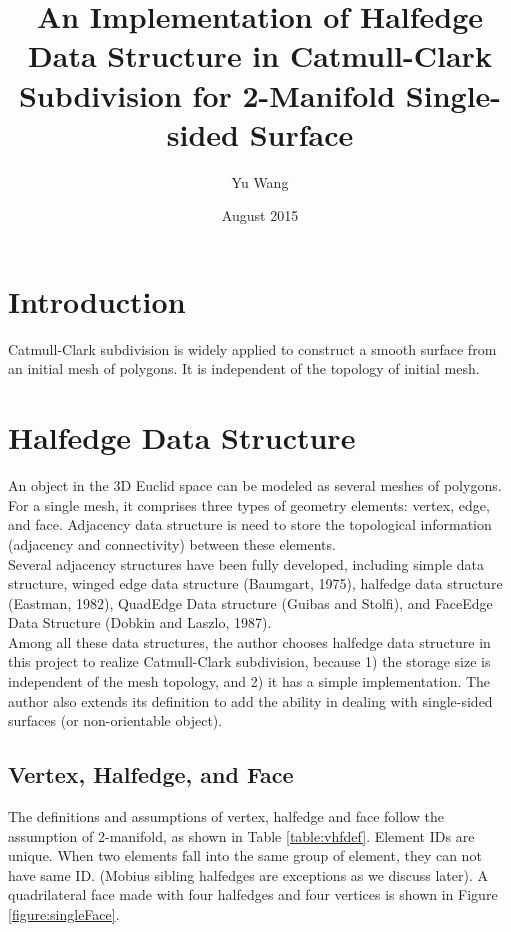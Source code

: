 \documentclass[12pt]{article}
\title{An Implementation of Halfedge Data Structure in Catmull-Clark 
Subdivision for 2-Manifold Single-sided Surface}
\author{Yu Wang}
\date{August 2015}
\begin{document}
\maketitle
\newpage


\section{Introduction}
Catmull-Clark subdivision is widely applied to construct a smooth surface from an initial mesh of polygons. It is independent of the topology of initial mesh.
\section{Halfedge Data Structure} \label{sec:halfedge}

An object in the 3D Euclid space can be modeled as several meshes of polygons. For a single mesh, it comprises three types of geometry elements: vertex, edge, and face. Adjacency data structure is need to store the topological information (adjacency and connectivity) between these elements.\\
Several adjacency structures have been fully developed, including simple data structure, winged edge data structure (Baumgart, 1975), halfedge data structure (Eastman, 1982), QuadEdge Data structure (Guibas and Stolfi), and FaceEdge Data Structure (Dobkin and Laszlo, 1987).\\
Among all these data structures, the author chooses halfedge data structure in this project to realize Catmull-Clark subdivision, because 1) the storage size is independent of the mesh topology, and 2) it has a simple implementation. The author also extends its definition to add the ability in dealing with single-sided surfaces (or non-orientable object).

\subsection{Vertex, Halfedge, and Face}

The definitions and assumptions of vertex, halfedge and face follow the assumption of 2-manifold, as shown in Table \ref{table:vhfdef}. Element IDs are unique. When two elements fall into the same group of element, they can not have same ID. (Mobius sibling halfedges are exceptions as we discuss later). A quadrilateral face made with four halfedges and four vertices is shown in Figure \ref{figure:singleFace}.
\end{document}
